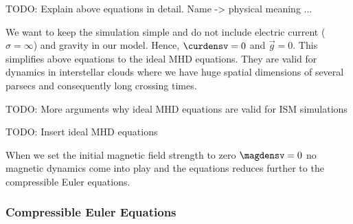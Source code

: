 TODO: Explain above equations in detail. Name -> physical meaning ...

We want to keep the simulation simple and do not include electric current
($\sigma = \infty$) and gravity in our model. Hence, $\curdensv = 0$ and
$\vec{g} = 0$. This simplifies above equations to the ideal MHD equations.
They are valid for dynamics in interstellar clouds where we have huge
spatial dimensions of several parsecs and consequently long crossing times.

TODO: More arguments why ideal MHD equations are valid for ISM simulations

TODO: Insert ideal MHD equations

When we set the initial magnetic field strength to zero $\magdensv = 0$ no
magnetic dynamics come into play and the equations reduces further to the
compressible Euler equations.

\subsubsection{Compressible Euler Equations}



